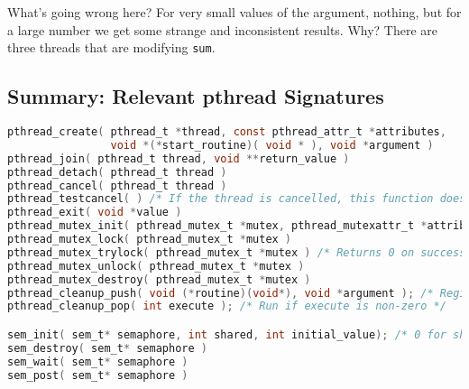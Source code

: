 What's going wrong here? For very small values of the argument, nothing, but for a large number we get some strange and inconsistent results. Why? There are three threads that are modifying \texttt{sum}.

\subsection*{Summary: Relevant pthread Signatures}

\begin{lstlisting}[language=C]
pthread_create( pthread_t *thread, const pthread_attr_t *attributes,
                void *(*start_routine)( void * ), void *argument )
pthread_join( pthread_t thread, void **return_value )
pthread_detach( pthread_t thread )
pthread_cancel( pthread_t thread )
pthread_testcancel( ) /* If the thread is cancelled, this function does not return (thread terminated) */
pthread_exit( void *value )
pthread_mutex_init( pthread_mutex_t *mutex, pthread_mutexattr_t *attributes )
pthread_mutex_lock( pthread_mutex_t *mutex )
pthread_mutex_trylock( pthread_mutex_t *mutex ) /* Returns 0 on success */
pthread_mutex_unlock( pthread_mutex_t *mutex )
pthread_mutex_destroy( pthread_mutex_t *mutex )
pthread_cleanup_push( void (*routine)(void*), void *argument ); /* Register cleanup handler, with argument */ 
pthread_cleanup_pop( int execute ); /* Run if execute is non-zero */ 

sem_init( sem_t* semaphore, int shared, int initial_value); /* 0 for shared OK */
sem_destroy( sem_t* semaphore )
sem_wait( sem_t* semaphore )
sem_post( sem_t* semaphore )
\end{lstlisting}




